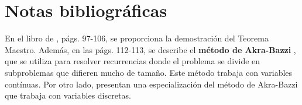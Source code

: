 \section{Notas bibliográficas}

En el libro de \textcite{cormen_2009}, págs. 97-106, se proporciona la demostración del Teorema Maestro.
Además, en las págs. 112-113, se describe el \textbf{método de Akra-Bazzi} \citep{akra_1998,leighton_1996}, que se utiliza para resolver recurrencias donde el problema se divide en subproblemas que difieren mucho de tamaño.
Este método trabaja con variables contínuas.
Por otro lado, \textcite{drmota_2013} presentan una especialización del método de Akra-Bazzi que trabaja con variables discretas. 


